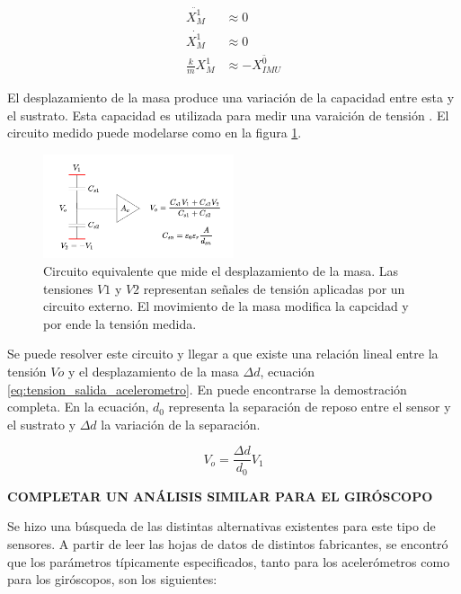 \begin{subequations}
	\begin{align}
        \ddot{X_M^1} &\approx 0\\
        \dot{X_M^1} &\approx 0\\
        \frac{k}{m} X_M^1 &\approx -\ddot{X_{IMU}^0}
	\end{align}
    \label{eq:relacion_aceleracion_despalzamiento}
\end{subequations}

El desplazamiento de la masa produce una variación de la capacidad entre esta y el sustrato. Esta capacidad es utilizada para medir una varaición de tensión \cite{zhang2010sensing}. El circuito medido puede modelarse como en la figura \ref{fig:acelerometro_sensado_capacitivo}.

\begin{figure}[H]
    \centering
    \includegraphics[width=0.5\textwidth]{img/acelerometro_sensado_capacitivo.png}
    \caption{Circuito equivalente que mide el desplazamiento de la masa. Las tensiones $V1$ y $V2$ representan señales de tensión aplicadas por un circuito externo. El movimiento de la masa modifica la capcidad y por ende la tensión medida.}
    \label{fig:acelerometro_sensado_capacitivo}    
\end{figure}

Se puede resolver este circuito y llegar a que existe una relación lineal entre la tensión $Vo$ y el desplazamiento de la masa $\Delta d$, ecuación \eqref{eq:tension_salida_acelerometro}. En \cite{zhang2010sensing} puede encontrarse la demostración completa. En la ecuación, $d_0$ representa la separación de reposo entre el sensor y el sustrato y $\Delta d$ la variación de la separación.

\begin{equation}
    V_{o} = \frac{\Delta d}{d_0} V_1
    \label{eq:tension_salida_acelerometro}
\end{equation}

\textbf{{\color{red} COMPLETAR UN ANÁLISIS SIMILAR PARA EL GIRÓSCOPO}}

Se hizo una búsqueda de las distintas alternativas existentes para este tipo de sensores. A partir de leer las hojas de datos de distintos fabricantes, se encontró que los parámetros típicamente especificados, tanto para los acelerómetros como para los giróscopos, son los siguientes:

